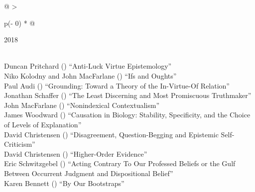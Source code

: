 \documentclass[
  10pt,
  letterpaper,
  DIV=11,
  numbers=noendperiod,
  twoside]{scrartcl}
\begin{document}
\begin{longtable}[]{@{}
  >{\raggedright\arraybackslash}p{(\columnwidth - 0\tabcolsep) * }@{}}

\caption{\label{tbl-top-ten-2009}Most cited articles published less than
ten years ago as of 2018.}

\tabularnewline

\toprule\noalign{}
\begin{minipage}[b]{\linewidth}\raggedright
2018
\end{minipage} \\
\midrule\noalign{}
\endhead
\bottomrule\noalign{}
\endlastfoot
Duncan Pritchard
()
``Anti-Luck Virtue Epistemology'' \\
Niko Kolodny and John MacFarlane
()
``Ifs and Oughts'' \\
Paul Audi
()
``Grounding: Toward a Theory of the In-Virtue-Of Relation'' \\
Jonathan Schaffer
()
``The Least Discerning and Most Promiscuous Truthmaker'' \\
John MacFarlane
()
``Nonindexical Contextualism'' \\
James Woodward
()
``Causation in Biology: Stability, Specificity, and the Choice of Levels
of Explanation'' \\
David Christensen
()
``Disagreement, Question-Begging and Epistemic Self-Criticism'' \\
David Christensen
()
``Higher-Order Evidence'' \\
Eric Schwitzgebel
()
``Acting Contrary To Our Professed Beliefs or the Gulf Between Occurrent
Judgment and Dispositional Belief'' \\
Karen Bennett
()
``By Our Bootstraps'' \\

\end{longtable}
\end{document}
